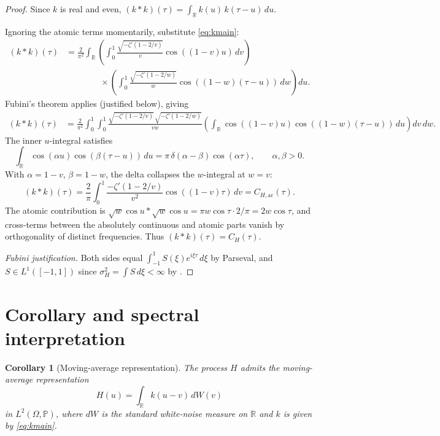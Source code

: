 \documentclass[11pt,reqno]{amsart}
\newtheorem{corollary}[theorem]{Corollary}
\theoremstyle{definition}
\theoremstyle{remark}
\begin{document}
\begin{proof}
Since \(k\) is real and even, \((k*k)(\tau) = \int_{\mathbb{R}}
k(u)\,k(\tau-u)\,du\).

Ignoring the atomic terms momentarily, substitute \eqref{eq:kmain}:
\begin{align*}
  (k*k)(\tau)
  &= \frac{2}{\pi^2}
     \int_{\mathbb{R}}
     \left(\int_0^1 \frac{\sqrt{-\zeta'(1-2/v)}}{v}
       \cos((1-v)u)\,dv\right)\\
  &\qquad\qquad\times
     \left(\int_0^1 \frac{\sqrt{-\zeta'(1-2/w)}}{w}
       \cos((1-w)(\tau-u))\,dw\right)du.
\end{align*}
Fubini's theorem applies (justified below), giving
\begin{align*}
  (k*k)(\tau)
  &= \frac{2}{\pi^2}
     \int_0^1\!\int_0^1
     \frac{\sqrt{-\zeta'(1-2/v)}\,\sqrt{-\zeta'(1-2/w)}}{vw}
     \left(\int_{\mathbb{R}}\cos((1-v)u)\cos((1-w)(\tau-u))\,du\right)
     dv\,dw.
\end{align*}
The inner \(u\)-integral satisfies
\begin{equation}\label{eq:cosconv}
  \int_{\mathbb{R}}\cos(\alpha u)\cos(\beta(\tau-u))\,du
  = \pi\,\delta(\alpha-\beta)\cos(\alpha\tau),
  \qquad \alpha,\beta > 0.
\end{equation}
With \(\alpha = 1-v\), \(\beta = 1-w\), the delta collapses the
\(w\)-integral at \(w=v\):
\[
  (k*k)(\tau)
  = \frac{2}{\pi}
    \int_0^1
    \frac{-\zeta'(1-2/v)}{v^2}
    \cos((1-v)\tau)\,dv
  = C_{H,\mathrm{ac}}(\tau).
\]
The atomic contribution is \(\sqrt{w}\cos u * \sqrt{w}\cos u =
\pi w\cos\tau\cdot 2/\pi = 2w\cos\tau\), and cross-terms between the
absolutely continuous and atomic parts vanish by orthogonality of
distinct frequencies. Thus \((k*k)(\tau) = C_H(\tau)\).

\medskip
\noindent\emph{Fubini justification.} Both sides equal
\(\int_{-1}^1 S(\xi)e^{i\xi\tau}\,d\xi\) by Parseval, and
\(S \in L^1([-1,1])\) since \(\sigma_H^2 = \int S\,d\xi < \infty\)
by \cite{HardyZV2}.
\end{proof}

\section{Corollary and spectral interpretation}

\begin{corollary}[Moving-average representation]\label{cor:MA}
The process \(H\) admits the moving-average representation
\[
  H(u) = \int_{\mathbb{R}} k(u-v)\,dW(v)
\]
in \(L^2(\Omega,\mathbb{P})\), where \(dW\) is the standard white-noise
measure on \(\mathbb{R}\) and \(k\) is given by \eqref{eq:kmain}.
\end{corollary}
\end{document}
